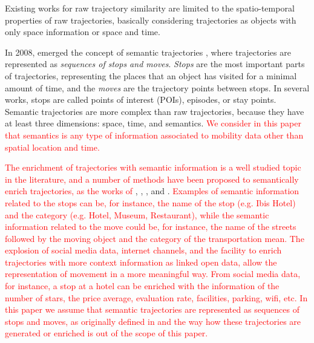 \documentclass[12pt]{article}
\begin{document}
Existing works for raw trajectory similarity are limited to the spatio-temporal properties of raw trajectories, basically considering trajectories as objects with only space information or space and time.

In 2008, emerged the concept of semantic trajectories \citep{Spaccapietra:2008:CVT:1347466.1347785}, where trajectories are represented as \emph{sequences of stops and moves}. \emph{Stops} are the most important parts of trajectories, representing the places that an object has visited for a minimal amount of time, and the \emph{moves} are the trajectory points between stops. In several works, stops are called points of interest (POIs), episodes, or stay points. Semantic trajectories are more complex than raw trajectories, because they have at least three dimensions: space, time, and semantics. \textcolor{red}{We consider in this paper that semantics is any type of information associated to mobility data other than spatial location and time.}

\textcolor{red}{The enrichment of trajectories with semantic information is a well studied topic in the literature, and a number of methods have been proposed to semantically enrich trajectories, as the works of} \cite{alvares2007model}, \cite{Palma2008}, \cite{manso}, and \cite{fileto2013baquara}. \textcolor{red}{Examples of semantic information related to the stops can be, for instance, the name of the stop (e.g. Ibis Hotel) and the category (e.g. Hotel, Museum, Restaurant), while the semantic information related to the move could be, for instance, the name of the streets followed by the moving object and the category of the transportation mean. The explosion of social media data, internet channels, and the facility to enrich trajectories with more context information as linked open data, allow the representation of movement in a more meaningful way. From social media data, for instance, a stop at a hotel can be enriched with the information of the number of stars, the price average, evaluation rate, facilities, parking, wifi, etc.  In this paper we assume that semantic trajectories are represented as sequences of stops and moves, as originally defined in \cite{Spaccapietra:2008:CVT:1347466.1347785} and the way how these trajectories are generated or enriched is out of the scope of this paper. }
\end{document}
